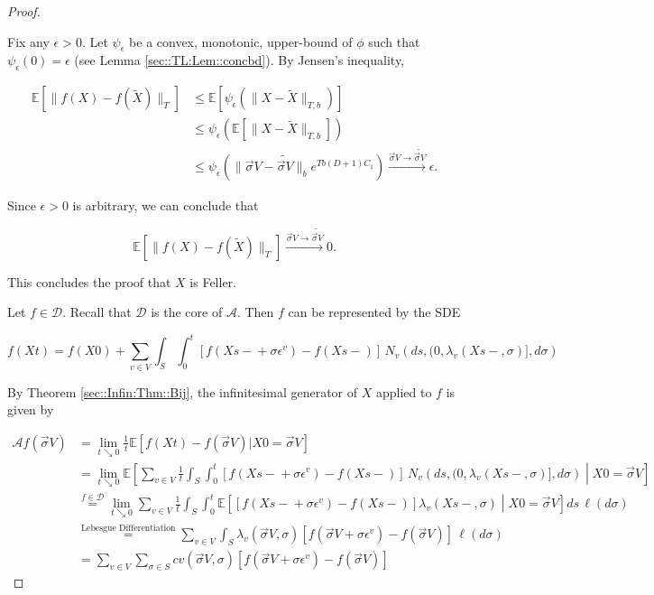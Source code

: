\documentclass[12pt]{article}
\newcommand{\mb}{\mathbb}
\newcommand{\mc}{\mathcal}
\newcommand{\ra}{\rightarrow}
\newcommand{\os}{\overset}
\newcommand{\te}{\text}
\newcommand{\ep}{\epsilon}
\newcommand{\ind}{\hspace{24pt}}
\newcommand{\ex}[1]{\mb{E}\left[#1\right]}			%
\renewcommand{\v}{v}							%
\renewcommand{\S}{S}							%
\newcommand{\s}{\sigma}							%
\newcommand{\sv}{\vec{\s}}						%
\renewcommand{\b}{b}							%
\newcommand{\ev}[1]{\ep^{#1}}					%
\newcommand{\T}{T}								%
\renewcommand{\t}{t}							%
\renewcommand{\tt}{s}							%
\newcommand{\X}{X}								%
\newcommand{\IG}{\mc{A}}						%
\newcommand{\IGr}{c}							%
\newcommand{\degr}{D}								%
\newcommand{\poiss}[1]{N_{#1}}						%
\newcommand{\core}{\mc{D}}							%
\newcommand{\V}{V}									%
\newcommand{\XState}[1]{\S^{#1}}				%
\newcommand{\rate}[1]{\lambda_{#1}}					%
\newcommand{\const}[1]{C_{#1}}						%
\newcommand{\Sm}{\ell}								%
\newcommand{\alt}{\widetilde}						%
\begin{document}
\begin{proof}
\begin{enumerate}[(a)]
\ind Fix any \(\ep > 0\). Let \(\psi_\ep\) be a convex, monotonic, upper-bound of \(\phi\) such that \(\psi_\ep(0) = \ep\) (see Lemma \ref{sec::TL:Lem::concbd}). By Jensen's inequality,

\begin{align*}
\ex{\|f(\X{}{}) - f(\alt{\X{}{}})\|_\T} &\leq \ex{\psi_\ep\left(\|\X{}{} - \alt{\X{}{}}\|_{\T,\b{}}\right)}\\
&\leq \psi_\ep\left(\ex{\|\X{}{} - \alt{\X{}{}}\|_{\T,\b{}}}\right)\\
&\leq \psi_\ep\left(\|\sv{}{\V} - \alt{\sv{}{\V}}\|_{\b{}}e^{\T\b{}(\degr+1)\const{1}}\right) \os{\sv{}{\V} \ra\alt{\sv{}{\V}}}{\ra} \ep.
\end{align*}

Since \(\ep > 0\) is arbitrary, we can conclude that 

\[\ex{\|f(\X{}{}) - f(\alt{\X{}{}})\|_\T} \os{\sv{}{\V} \ra\alt{\sv{}{\V}}}{\ra} 0.\]

This concludes the proof that \(\X{}{}\) is Feller.
\end{enumerate}

Let \(f \in \core\). Recall that \(\core\) is the core of \(\IG\). Then \(f\) can be represented by the SDE

\[f(\X{}{\t}) = f(\X{}{0}) + \sum_{\v \in \V} \int_\S\int_0^\t [f(\X{}{\tt-} + \s\ev{\v}) - f(\X{}{\tt-})]\,\poiss{\v}\left(d\tt,(0,\rate{\v}(\X{}{\tt-},\s)],d\s\right)\]


By Theorem \ref{sec::Infin:Thm::Bij}, the infinitesimal generator of \(\X{}{}\) applied to \(f\) is given by 

\begin{align*}
\IG f(\sv{}{\V}) &= \lim_{\t \searrow 0} \frac{1}{\t} \ex{f(\X{}{\t}) - f(\sv{}{\V})|\X{}{0} = \sv{}{\V}}\\
&= \lim_{\t \searrow 0} \ex{\sum_{\v \in \V} \frac{1}{\t}\int_\S\int_0^\t \left[f(\X{}{\tt-} + \s\ev{\v}) - f(\X{}{\tt-})\right]\,\poiss{\v}\left(d\tt,(0,\rate{\v}(\X{}{\tt-},\s)],d\s\right)\middle|\X{}{0} = \sv{}{\V}}\\
&\os{f \in \mc{D}}{=} \lim_{\t \searrow 0}\sum_{\v \in \V} \frac{1}{\t}\int_\S\int_0^\t \ex{\left[f(\X{}{\tt-} + \s\ev{\v}) - f(\X{}{\tt-})\right]\rate{\v}(\X{}{\tt-},\s)\middle|\X{}{0} = \sv{}{\V}}d\tt\,\Sm(d\s)\\
&\os{\te{Lebesgue Differentiation}}{=} \sum_{\v \in \V} \int_\S \rate{\v}(\sv{}{\V},\s)[f(\sv{}{\V} + \s\ev{\v}) - f(\sv{}{\V})]\,\Sm(d\s)\\
&= \sum_{\v \in \V} \sum_{\s \in \S} \IGr{\v}(\sv{}{\V},\s)[f(\sv{}{\V} + \s\ev{\v}) - f(\sv{}{\V})]
\end{align*}
\end{proof}
\end{document}
